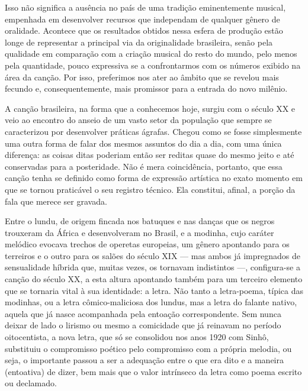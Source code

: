 Isso não significa a ausência no país de uma tradição eminentemente
musical, empenhada em desenvolver recursos que independam de qualquer
gênero de oralidade. Acontece que os resultados obtidos nessa esfera de
produção estão longe de representar a principal via da originalidade
brasileira, senão pela qualidade em comparação com a criação musical do
resto do mundo, pelo menos pela quantidade, pouco expressiva se a
confrontarmos com os números exibido na área da canção. Por isso,
preferimos nos ater ao âmbito que se revelou mais fecundo e,
consequentemente, mais promissor para a entrada do novo milênio.

A canção brasileira, na forma que a conhecemos hoje, surgiu com o século
XX e veio ao encontro do anseio de um vasto setor da população que
sempre se caracterizou por desenvolver práticas ágrafas. Chegou como se
fosse simplesmente uma outra forma de falar dos mesmos assuntos do dia a
dia, com uma única diferença: as coisas ditas poderiam então ser reditas
quase do mesmo jeito e até conservadas para a posteridade. Não é mera
coincidência, portanto, que essa canção tenha se definido como forma de
expressão artística no exato momento em que se tornou praticável o seu
registro técnico. Ela constitui, afinal, a porção da fala que merece ser
gravada.

Entre o lundu, de origem fincada nos batuques e nas danças que os negros
trouxeram da África e desenvolveram no Brasil, e a modinha, cujo caráter
melódico evocava trechos de operetas europeias, um gênero apontando para
os terreiros e o outro para os salões do século XIX --- mas ambos já
impregnados de sensualidade híbrida que, muitas vezes, os tornavam
indistintos ---, configura-se a canção do século XX, a esta altura
apontando também para um terceiro elemento que se tornaria vital à sua
identidade: a letra. Não tanto a letra-poema, típica das modinhas, ou a
letra cômico-maliciosa dos lundus, mas a letra do falante nativo, aquela
que já nasce acompanhada pela entoação correspondente. Sem nunca deixar
de lado o lirismo ou mesmo a comicidade que já reinavam no período
oitocentista, a nova letra, que só se consolidou nos anos 1920 com
Sinhô, substituiu o compromisso poético pelo compromisso com a própria
melodia, ou seja, o importante passou a ser a adequação entre o que era
dito e a maneira (entoativa) de dizer, bem mais que o valor intrínseco
da letra como poema escrito ou declamado.

